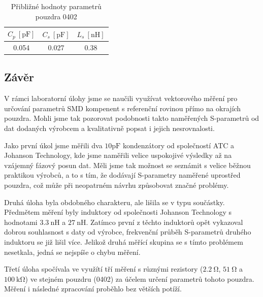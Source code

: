 \documentclass[11pt,a4paper]{article}
\newcommand{\Ohm}{\mathrm{\Omega}}
\newcommand{\kOhm}{\mathrm{k\Omega}}
\begin{document}
\begin{table}[!ht]
    \centering
    \begin{tabular}{|c|c|c|}
        \hline
        $C_p\ [\mathrm{pF}]$ & $C_s\ [\mathrm{pF}]$ & $L_s\ [\mathrm{nH}]$\\
        \hline\hline
        0.054 & 0.027 & 0.38\\
        \hline
    \end{tabular}
    \caption{\label{table:parametry-pouzdra}Přibližné hodnoty parametrů pouzdra 0402}
\end{table}

\subsection*{Závěr}
V rámci laboratorní úlohy jsme se naučili využívat vektorového měření pro určování parametrů SMD kompenent s referenční rovinou přímo na okrajích pouzdra. Mohli jsme tak pozorovat podobnosti takto naměřených S-parametrů od dat dodaných výrobcem a kvalitativně popsat i jejich nesrovnalosti.

Jako první úkol jsme měřili dva $10\mathrm{pF}$ kondenzátory od společností ATC a Johanson Technology, kde jsme naměřili velice uspokojivé výsledky až na vzájemný fázový posun dat. Měli jsme tak možnost se seznámit s velice běžnou praktikou výrobců, a to s tím, že dodávají S-parametry naměřené uprostřed pouzdra, což může při neopatrném návrhu způsobovat značné problémy.

Druhá úloha byla obdobného charakteru, ale lišila se v typu součástky. Předmětem měření byly induktory od společnosti Johanson Technology s hodnotami $3.3\ \mathrm{nH}$ a $27\ \mathrm{nH}$. Zatímco první z těchto induktorů opět vykazoval dobrou souhlasnost s daty od výrobce, frekvenční průběh S-parametrů druhého induktoru se již lišil více. Jelikož druhá měřící skupina se s tímto problémem nesetkala, jedná se nejspíše o chybu měření.

Třetí úloha spočívala ve využítí tří měření s různými rezistory ($2.2\ \Ohm$, $51\ \Ohm$ a $100\ \kOhm$) ve stejném pouzdru (0402) za účelem určení parametrů tohoto pouzdra. Měření i následné zpracování proběhlo bez větších potíží.
\end{document}
